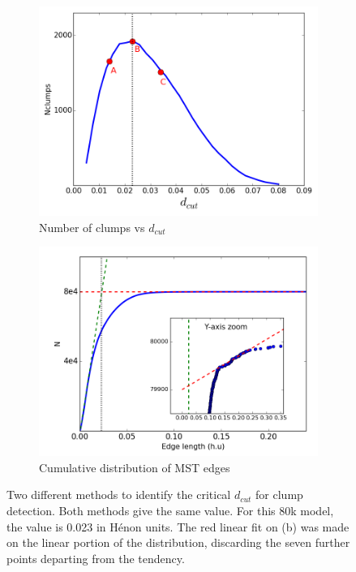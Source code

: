\begin{figure}
    \centering
    \begin{subfigure}[b]{0.49\textwidth}
    	\centering
    	\includegraphics[width=\textwidth]{Figures/2_Ndcut.png}
        \caption{Number of clumps vs $d_{cut}$}
        \label{Fig:2_Ndcut}
    \end{subfigure}
    \begin{subfigure}[b]{0.49\textwidth}
    	\centering
    	\includegraphics[width=\textwidth]{Figures/2_dcutdistribution.png}
        \caption{Cumulative distribution of MST edges}
        \label{Fig:2_dcutcumulated}
    \end{subfigure}
\caption[Two different methods to identify the critical $d_{cut}$ for clump detection]{Two different methods to identify the critical $d_{cut}$ for clump detection. Both methods give the same value. For this 80k model, the value is 0.023 in H\'enon units. The red linear fit on (b) was made on the linear portion of the distribution, discarding the seven further points departing from the tendency.}
\label{Fig:0_dcutchoice}
\end{figure}


